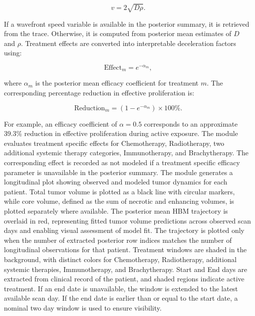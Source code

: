 \begin{equation}
v = 2\sqrt{D\rho}.
\end{equation}

If a wavefront speed variable is available in the posterior summary, it is retrieved from the trace. Otherwise, it is computed from posterior mean estimates of $D$ and $\rho$. Treatment effects are converted into interpretable deceleration factors using:

\begin{equation}
\mathrm{Effect}_m = e^{-\alpha_m},
\end{equation}

where $\alpha_m$ is the posterior mean efficacy coefficient for treatment $m$. The corresponding percentage reduction in effective proliferation is:

\begin{equation}
\mathrm{Reduction}_m = \left(1 - e^{-\alpha_m}\right) \times 100\%.
\end{equation}

For example, an efficacy coefficient of $\alpha = 0.5$ corresponds to an approximate 39.3\% reduction in effective proliferation during active exposure. The module evaluates treatment specific effects for Chemotherapy, Radiotherapy, two additional systemic therapy categories, Immunotherapy, and Brachytherapy. The corresponding effect is recorded as not modeled if a treatment specific efficacy parameter is unavailable in the posterior summary. The module generates a longitudinal plot showing observed and modeled tumor dynamics for each patient. Total tumor volume is plotted as a black line with circular markers, while core volume, defined as the sum of necrotic and enhancing volumes, is plotted separately where available. The posterior mean HBM trajectory is overlaid in red, representing fitted tumor volume predictions across observed scan days and enabling visual assessment of model fit. The trajectory is plotted only when the number of extracted posterior row indices matches the number of longitudinal observations for that patient. Treatment windows are shaded in the background, with distinct colors for Chemotherapy, Radiotherapy, additional systemic therapies, Immunotherapy, and Brachytherapy. Start and End days are extracted from clinical record of the patient, and shaded regions indicate active treatment. If an end date is unavailable, the window is extended to the latest available scan day. If the end date is earlier than or equal to the start date, a nominal two day window is used to ensure visibility.


